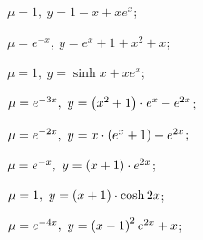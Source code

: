 	\begin{enumsols}

		\item \( \mu = 1, ~ y = 1 - x + x e^x \); %
		\item \( \mu = e^{-x}, ~ y = e^x + 1 + x^2 + x \); %
		\item \( \mu = 1, ~ y = \sinh{x} + x e^x \); %
		\item \( \mu = e^{-3x}, ~ y = \left( x^2 + 1 \right) \cdot e^x - e^{2x} \); %
		\item \( \mu = e^{-2x}, ~ y = x \cdot \left( e^x + 1 \right) + e^{2x} \); %
		\item \( \mu = e^{-x}, ~ y = \left( x + 1 \right) \cdot e^{2x} \); %
		\item \( \mu = 1, ~ y = \left( x + 1 \right) \cdot \cosh{2x} \); %
		\item \( \mu = e^{-4x}, ~ y = \left( x - 1 \right)^2 e^{2x} + x \); %
		

\end{enumsols}
